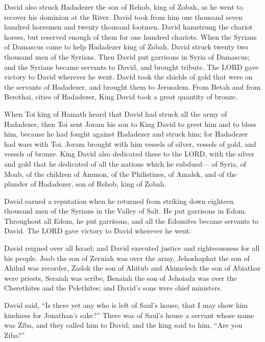 \myverse{}David also struck Hadadezer the son of Rehob, king of Zobah, as
he went to recover his dominion at the River.
\myverse{}David took from him one thousand seven hundred horsemen and twenty thousand
footmen. David hamstrung the chariot horses, but reserved enough of them for one hundred chariots.
\myverse{}When the Syrians of Damascus came to help Hadadezer king of Zobah, David struck
twenty two thousand men of the Syrians.
\myverse{}Then David put garrisons in Syria of Damascus; and the Syrians became servants
to David, and brought tribute. The LORD gave victory to David wherever he went.
\myverse{}David took the shields of gold that were on the servants of Hadadezer, and brought
them to Jerusalem.
\myverse{}From Betah and from Berothai, cities of Hadadezer, King David took a great quantity
of bronze.

\myverse{}When Toi king of Hamath heard that David had struck all the army
of Hadadezer,
\myverse{}then Toi sent Joram his son to King David to greet him and to bless him, because
he had fought against Hadadezer and struck him; for Hadadezer had wars with Toi. Joram brought with him
vessels of silver, vessels of gold, and vessels of bronze.
\myverse{}King David also dedicated these to the LORD, with the silver and gold that
he dedicated of all the nations which he subdued—
\myverse{}of Syria, of Moab, of the children of Ammon, of the Philistines, of Amalek,
and of the plunder of Hadadezer, son of Rehob, king of Zobah.

\myverse{}David earned a reputation when he returned from striking down
eighteen thousand men of the Syrians in the Valley of Salt.
\myverse{}He put garrisons in Edom. Throughout all Edom, he put garrisons, and all the
Edomites became servants to David. The LORD gave victory to David wherever he went.

\myverse{}David reigned over all Israel; and David executed justice and
righteousness for all his people.
\myverse{}Joab the son of Zeruiah was over the army, Jehoshaphat the son of Ahilud was
recorder,
\myverse{}Zadok the son of Ahitub and Ahimelech the son of Abiathar were priests, Seraiah
was scribe,
\myverse{}Benaiah the son of Jehoiada was over the Cherethites and the Pelethites; and
David’s sons were chief ministers.


\mychapter{} \myverse*{}David said, “Is there yet any who is left of Saul’s house, that
I may show him kindness for Jonathan’s sake?”
\myverse{}There was of Saul’s house a servant whose name was Ziba, and they called him
to David; and the king said to him, “Are you Ziba?”

